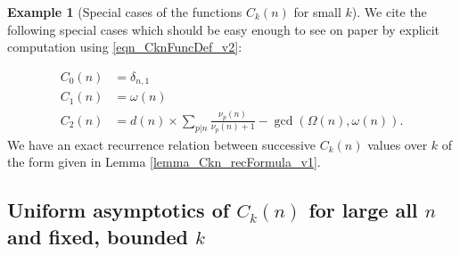 \documentclass[11pt,reqno,a4letter]{article}
\numberwithin{figure}{section}
\numberwithin{table}{section}
\theoremstyle{plain}
\numberwithin{theorem}{section}
\theoremstyle{definition}
\newtheorem{example}[theorem]{Example}
\newcommand{\NBRef}[1]{}
\begin{document}
\begin{example}[Special cases of the functions $C_k(n)$ for small $k$] 
\label{example_SpCase_Ckn} 
We cite the following special cases which should be easy enough to see on paper by 
explicit computation using \eqref{eqn_CknFuncDef_v2}: 
\NBRef{A07-2020-04-26} 
\begin{align*} 
C_0(n) & = \delta_{n,1} \\ 
C_1(n) & = \omega(n) \\ 
C_2(n) & = d(n) \times \sum_{p|n} \frac{\nu_p(n)}{\nu_p(n)+1} - \gcd\left(\Omega(n), \omega(n)\right). 
\end{align*} 
We have an exact recurrence relation between successive $C_k(n)$ values over $k$ of the form 
given in Lemma \ref{lemma_Ckn_recFormula_v1}. 
\end{example} 

\subsection{Uniform asymptotics of $C_k(n)$ for large all $n$ and fixed, bounded $k$} 
\end{document}
